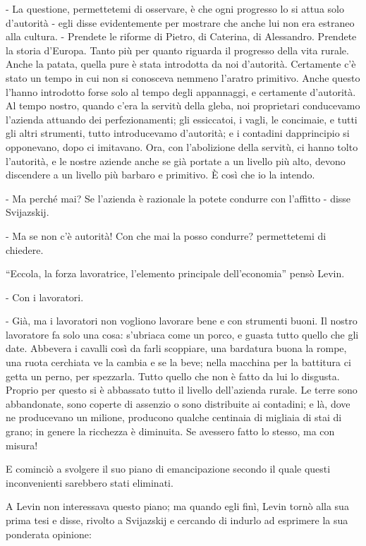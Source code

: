 - La questione, permettetemi di osservare, è che ogni progresso lo si attua solo d'autorità - egli disse evidentemente per mostrare che anche lui non era estraneo alla cultura. - Prendete le riforme di Pietro, di Caterina, di Alessandro. Prendete la storia d'Europa. Tanto più per quanto riguarda il progresso della vita rurale. Anche la patata, quella pure è stata introdotta da noi d'autorità. Certamente c'è stato un tempo in cui non si conosceva nemmeno l'aratro primitivo. Anche questo l'hanno introdotto forse solo al tempo degli appannaggi, e certamente d'autorità. Al tempo nostro, quando c'era la servitù della gleba, noi proprietari conducevamo l'azienda attuando dei perfezionamenti; gli essiccatoi, i vagli, le concimaie, e tutti gli altri strumenti, tutto introducevamo d'autorità; e i contadini dapprincipio si opponevano, dopo ci imitavano. Ora, con l'abolizione della servitù, ci hanno tolto l'autorità, e le nostre aziende anche se già portate a un livello più alto, devono discendere a un livello più barbaro e primitivo. È così che io la intendo. 

- Ma perché mai? Se l'azienda è razionale la potete condurre con l'affitto - disse Svijazskij. 

- Ma se non c'è autorità! Con che mai la posso condurre? permettetemi di chiedere. 

``Eccola, la forza lavoratrice, l'elemento principale dell'economia'' pensò Levin. 

- Con i lavoratori. 

- Già, ma i lavoratori non vogliono lavorare bene e con strumenti buoni. Il nostro lavoratore fa solo una cosa: s'ubriaca come un porco, e guasta tutto quello che gli date. Abbevera i cavalli così da farli scoppiare, una bardatura buona la rompe, una ruota cerchiata ve la cambia e se la beve; nella macchina per la battitura ci getta un perno, per spezzarla. Tutto quello che non è fatto da lui lo disgusta. Proprio per questo si è abbassato tutto il livello dell'azienda rurale. Le terre sono abbandonate, sono coperte di assenzio o sono distribuite ai contadini; e là, dove ne producevano un milione, producono qualche centinaia di migliaia di stai di grano; in genere la ricchezza è diminuita. Se avessero fatto lo stesso, ma con misura! 

E cominciò a svolgere il suo piano di emancipazione secondo il quale questi inconvenienti sarebbero stati eliminati. 

A Levin non interessava questo piano; ma quando egli finì, Levin tornò alla sua prima tesi e disse, rivolto a Svijazskij e cercando di indurlo ad esprimere la sua ponderata opinione: 

